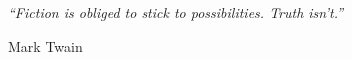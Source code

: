 \clearpage
\thispagestyle{plain}
\phantom{.}\vfill
\begin{center}
  \begin{minipage}{
      \widthof{\it ``Fiction is obliged to stick to possibilities.  Truth isn't.''}}
    {\it ``Fiction is obliged to stick to possibilities.  Truth isn't.''}


    {\hfill Mark Twain}
  \end{minipage}%
\end{center}
\vfill
\vspace{10cm}
